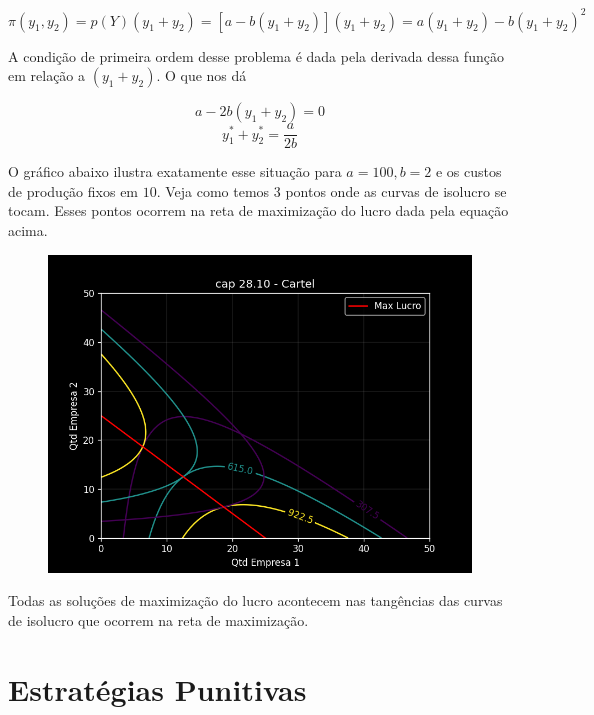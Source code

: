 \documentclass[a4paper,11pt,oneside]{book}
\theoremstyle{definition}
\theoremstyle{break}
\begin{document}
$$\pi(y_1,y_2) = p(Y)(y_1 + y_2) = [a - b(y_1 + y_2)](y_1 + y_2) = a(y_1 + y_2) - b(y_1 + y_2)^2$$

A condição de primeira ordem desse problema é dada pela derivada dessa função em relação a $(y_1 + y_2)$. O que nos dá

$$a - 2b(y_1 + y_2) = 0$$
$$y_1^* + y_2^* = \frac{a}{2b}$$

O gráfico abaixo ilustra exatamente esse situação para $a = 100, b = 2$ e os custos de produção fixos em $10$. Veja como temos 3 pontos onde as curvas de isolucro se tocam. Esses pontos ocorrem na reta de maximização do lucro dada pela equação acima.

\begin{figure}[H]
	\centering
	\includegraphics[scale=0.75]{cap28_10-cartel.png}
\end{figure}

Todas as soluções de maximização do lucro acontecem nas tangências das curvas de isolucro que ocorrem na reta de maximização.

\section{Estratégias Punitivas}
\end{document}
